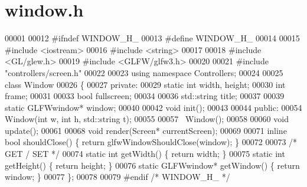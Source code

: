 \section{window.\+h}
\label{window_8h_source}

\begin{DoxyCode}
00001 
00012 \textcolor{preprocessor}{#ifndef WINDOW\_H\_}
00013 \textcolor{preprocessor}{#define WINDOW\_H\_}
00014 
00015 \textcolor{preprocessor}{#include <iostream>}
00016 \textcolor{preprocessor}{#include <string>}
00017 
00018 \textcolor{preprocessor}{#include <GL/glew.h>}
00019 \textcolor{preprocessor}{#include <GLFW/glfw3.h>}
00020 
00021 \textcolor{preprocessor}{#include "controllers/screen.h"}
00022 
00023 \textcolor{keyword}{using namespace }Controllers;
00024 
00025 \textcolor{keyword}{class }Window
00026 \{
00027 \textcolor{keyword}{private}:
00029     \textcolor{keyword}{static} \textcolor{keywordtype}{int}  width, height;
00030     \textcolor{keywordtype}{int}         frame;
00031 
00033     \textcolor{keywordtype}{bool}        fullscreen;
00034 
00036     std::string title;
00037 
00039     \textcolor{keyword}{static} GLFWwindow* window;
00040 
00042     \textcolor{keywordtype}{void} init();
00043 
00044 \textcolor{keyword}{public}:
00054     Window(\textcolor{keywordtype}{int} w, \textcolor{keywordtype}{int} h, std::string t);
00055 
00057     ~Window();
00058 
00060     \textcolor{keywordtype}{void} update();
00061 
00068     \textcolor{keywordtype}{void} render(Screen* currentScreen);
00069 
00071     \textcolor{keyword}{inline} \textcolor{keywordtype}{bool} shouldClose() \{ \textcolor{keywordflow}{return} glfwWindowShouldClose(window); \}
00072 
00073     \textcolor{comment}{/* GET / SET */}
00074     \textcolor{keyword}{static} \textcolor{keywordtype}{int}  getWidth()          \{ \textcolor{keywordflow}{return} width;  \}
00075     \textcolor{keyword}{static} \textcolor{keywordtype}{int}  getHeight()         \{ \textcolor{keywordflow}{return} height; \}
00076     \textcolor{keyword}{static} GLFWwindow* getWindow()  \{ \textcolor{keywordflow}{return} window; \}
00077 \};
00078 
00079 \textcolor{preprocessor}{#endif }\textcolor{comment}{/* WINDOW\_H\_ */}\textcolor{preprocessor}{}
\end{DoxyCode}
